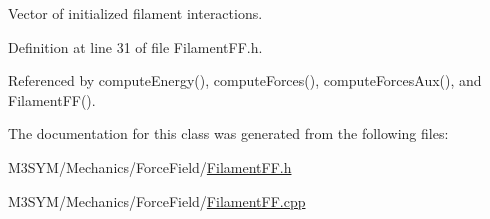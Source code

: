 Vector of initialized filament interactions. 



Definition at line 31 of file Filament\+F\+F.\+h.



Referenced by compute\+Energy(), compute\+Forces(), compute\+Forces\+Aux(), and Filament\+F\+F().



The documentation for this class was generated from the following files\+:\begin{DoxyCompactItemize}
\item 
M3\+S\+Y\+M/\+Mechanics/\+Force\+Field/\hyperlink{FilamentFF_8h}{Filament\+F\+F.\+h}\item 
M3\+S\+Y\+M/\+Mechanics/\+Force\+Field/\hyperlink{FilamentFF_8cpp}{Filament\+F\+F.\+cpp}\end{DoxyCompactItemize}
